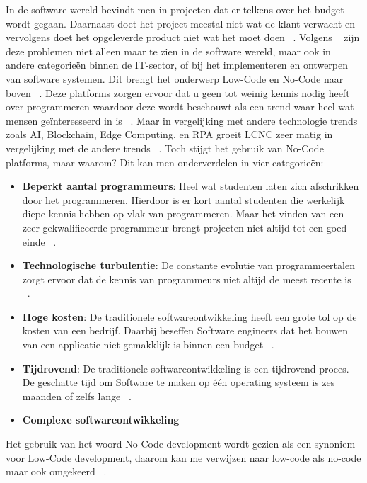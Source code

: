  In de software wereld bevindt men in projecten dat er telkens over het budget wordt gegaan. Daarnaast doet het project meestal niet wat de klant verwacht 
 en vervolgens  doet het opgeleverde product niet wat het moet doen ~\autocite{Moskal_2021}. Volgens ~\textcite{Moskal_2021} zijn deze problemen niet alleen maar te zien in de software wereld, 
 maar ook in andere categorieën binnen de IT-sector, of bij het implementeren en ontwerpen van software systemen. 
 Dit brengt het onderwerp Low-Code en No-Code naar boven ~\autocite{Kulkarni_2021}. 
 Deze platforms zorgen ervoor dat u geen tot weinig kennis nodig heeft over programmeren waardoor deze wordt beschouwt als een trend waar heel wat mensen geïnteresseerd in is ~\autocite{Kulkarni_2021}.
 Maar in vergelijking met andere technologie trends zoals AI, Blockchain, Edge Computing, en RPA groeit LCNC zeer matig in vergelijking met de andere trends ~\autocite{Kulkarni_2021}.
 Toch stijgt het gebruik van No-Code platforms, maar waarom? Dit kan men onderverdelen in vier categorieën:
\begin{itemize}
  \item \textbf{Beperkt aantal programmeurs}: 
  Heel wat studenten laten zich afschrikken door het programmeren. 
  Hierdoor is er kort aantal studenten die werkelijk diepe kennis hebben op vlak van programmeren. 
  Maar het vinden van een zeer gekwalificeerde programmeur brengt projecten niet altijd tot een goed einde ~\autocite{Moskal_2021}.
  \item \textbf{Technologische turbulentie}: De constante evolutie van programmeertalen zorgt ervoor dat de kennis van programmeurs niet altijd de meest recente is  ~\autocite{Moskal_2021}.
  \item \textbf{Hoge kosten}: De traditionele softwareontwikkeling heeft een grote tol op de kosten van een bedrijf. Daarbij beseffen Software engineers dat het bouwen van een applicatie niet gemakklijk is binnen een budget ~\autocite{Moskal_2021}.
  \item \textbf{Tijdrovend}: De traditionele softwareontwikkeling is een tijdrovend proces. De geschatte tijd om Software te maken op één operating systeem is zes maanden of zelfs lange ~\autocite{Moskal_2021}.
  \item \textbf{Complexe softwareontwikkeling}
\end{itemize} 
Het gebruik van het woord No-Code development wordt gezien als een synoniem voor Low-Code development,
daarom kan me verwijzen naar low-code als no-code maar ook omgekeerd ~\autocite{Rokis_2022}. 

